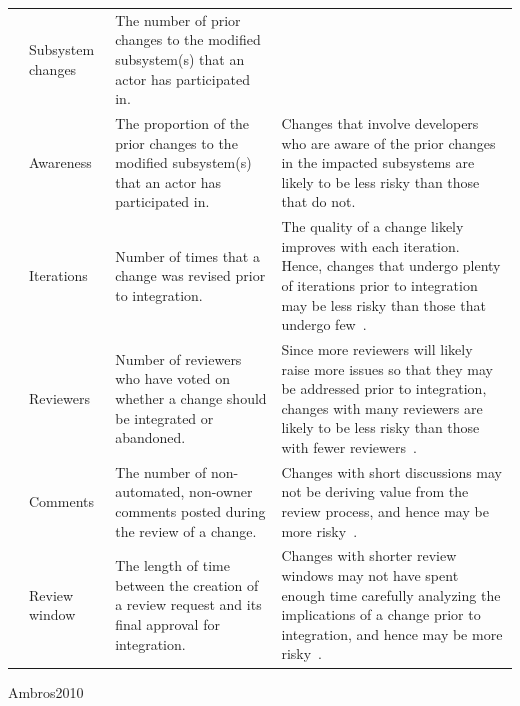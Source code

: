 \begin{table}[ht!]
{\begin{tabular}{|c|p{2cm}|p{5.7cm}|p{8.4cm}|}
			\cline{2-3}
			& Subsystem changes & The number of prior changes to the modified subsystem(s) that an actor has participated in. & \\
			\cline{2-4}
			& Awareness & The proportion of the prior changes to the modified subsystem(s) that an actor has participated in. & Changes that involve developers who are aware of the prior changes in the impacted subsystems are likely to be less risky than those that do not. \\
			\hline
			\multirow{12}{*}{\rotatebox{90}{Review}}
			& Iterations & Number of times that a change was revised prior to integration. & The quality of a change likely improves with each iteration. Hence, changes that undergo plenty of iterations prior to integration may be less risky than those that undergo few~\cite{porter1998tosem, thongtanunam2015msr}.\\
			\cline{2-4}
			& Reviewers & Number of reviewers who have voted on whether a change should be integrated or abandoned. & Since more reviewers will likely raise more issues so that they may be addressed prior to integration, changes with many reviewers are likely to be less risky than those with fewer reviewers~\cite{Raymond2001}. \\
			\cline{2-4}
			& Comments & The number of non-automated, non-owner comments posted during the review of a change. & Changes with short discussions may not be deriving value from the review process, and hence may be more risky~\cite{mcintosh2014impact, mcintosh2016empirical}.\\
			\cline{2-4}
			& Review window & The length of time between the creation of a review request and its final approval for integration. & Changes with shorter review windows may not have spent enough time carefully analyzing the implications of a change prior to integration, and hence may be more risky~\cite{porter1998tosem, thongtanunam2015msr}.\\
			\hline
		\end{tabular}
	}
\end{table}

Ambros2010

